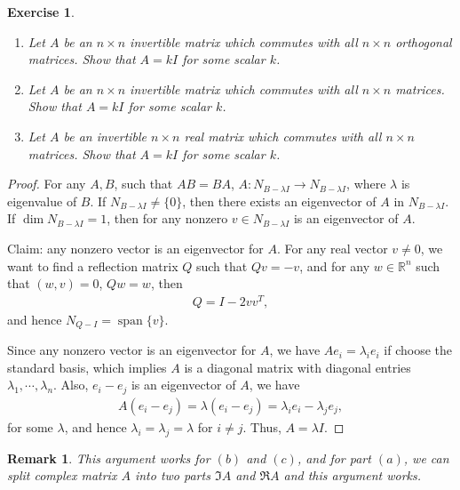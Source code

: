 \documentclass[11pt]{book}
\newtheorem{exercise}{Exercise}[section]
\newtheorem{remark}{Remark}[chapter]
\theoremstyle{definition}
\numberwithin{equation}{chapter}
\begin{document}
\begin{exercise} \label{commute_with_all_matrix}
~\begin{enumerate}[label=(\alph*)]
    \item Let $A$ be an $n \times n$ invertible matrix which commutes with all $n \times n$ orthogonal matrices. Show that $A = kI$ for some scalar $k$.
    
    \item Let $A$ be an $n \times n$ invertible matrix which commutes with all $n \times n$ matrices. Show that $A = kI$ for some scalar $k$.
    
    \item Let $A$ be an invertible $n \times n$ real matrix which commutes with all $n \times n$ matrices. Show that $A = kI$ for some scalar $k$.
\end{enumerate}
\end{exercise}
\begin{proof}
For any $A, B$, such that $AB = BA$, $A: N_{B - \lambda I} \to N_{B - \lambda I}$, where $\lambda$ is eigenvalue of $B$. If $N_{B - \lambda I} \neq \{0\}$, then there exists an eigenvector of $A$ in $N_{B - \lambda I}$. If $\dim  N_{B - \lambda I} = 1$, then for any nonzero $v \in N_{B - \lambda I}$ is an eigenvector of $A$.

Claim: any nonzero vector is an eigenvector for $A$. For any real vector $v \neq 0$, we want to find a reflection matrix $Q$ such that $Qv = -v$, and for any $w \in \mathbb{R}^n$ such that $(w,v) = 0$, $Qw = w$, then 
\begin{align*}
    Q = I - 2 v v^T,
\end{align*}
and hence $N_{Q - I} = \operatorname{span} \{v\}$. 

Since any nonzero vector is an eigenvector for $A$, we have $Ae_i = \lambda_i e_i$ if choose the standard basis, which implies $A$ is a diagonal matrix with diagonal entries $\lambda_1, \cdots, \lambda_n$. Also, $e_i - e_j$ is an eigenvector of $A$, we have 
\begin{align*}
    A (e_i - e_j) = \lambda (e_i - e_j) = \lambda_i e_i - \lambda_j e_j,
\end{align*}
for some $\lambda$, and hence $\lambda_i = \lambda_j = \lambda$ for $i \neq j$. Thus, $A = \lambda I$.
\end{proof}
\begin{remark}
This argument works for $(b)$ and $(c)$, and for part $(a)$, we can split complex matrix $A$ into two parts $\Im A$ and $\Re A$ and this argument works.
\end{remark}
\end{document}
